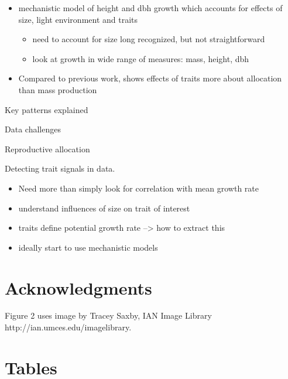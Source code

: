 \documentclass[12pt, a4paper]{article}
\begin{document}
\begin{itemize}
\itemsep1pt\parskip0pt
\item
  mechanistic model of height and dbh growth which accounts for effects
  of size, light environment and traits

  \begin{itemize}
  \itemsep1pt\parskip0pt
  \item
    need to account for size long recognized, but not straightforward
  \item
    look at growth in wide range of measures: mass, height, dbh
  \end{itemize}
\item
  Compared to previous work, shows effects of traits more about
  allocation than mass production
\end{itemize}


Key patterns explained

Data challenges

Reproductive allocation



Detecting trait signals in data.

\begin{itemize}
\item  Need more than simply look for correlation with mean growth rate
\item
  understand influences of size on trait of interest
\item
  traits define potential growth rate --\textgreater{} how to extract
  this
\item
  ideally start to use mechanistic models
\end{itemize}


\section{Acknowledgments}

Figure 2 uses image by Tracey Saxby, IAN Image Library http://ian.umces.edu/imagelibrary.

\newpage



\newpage

\section{Tables}\label{tables}
\end{document}
